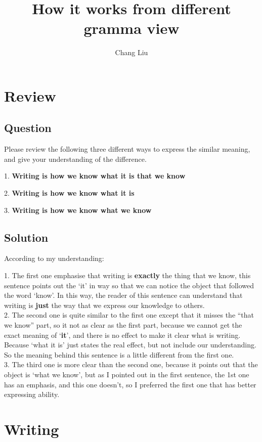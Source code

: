 \documentclass{article}
\title{How it works from different gramma view}
\author{Chang Liu}
\begin{document}
\maketitle

\section{Review}

\subsection{Question}
Please review the following three different ways to express the similar meaning, and give your understanding of the difference.

1. \textbf{Writing is how we know what it is that we know}

2. \textbf{Writing is how we know what it is}

3. \textbf{Writing is how we know what we know}

\subsection{Solution}
According to my understanding:

1. The first one emphasise that writing is \textbf{exactly} the thing that we know, this sentence points out the `it' in way so that we can notice
the object that followed the word `know'. In this way, the reader of this sentence can understand that writing is \textbf{just} the way that we express our knowledge to others.\\

2. The second one is quite similar to the first one except that it misses the ``that we know'' part, so it not as clear as the first part, because we cannot get the exact meaning of `\textbf{it}', and there is no effect to make it clear what is writing. Because `what it is' just states the real effect, but not include our understanding. So the meaning behind this sentence is a little different from the first one.\\

3. The third one is more clear than the second one, because it points out that the object is `what we know', but as I pointed out in the first sentence, the 1st one has an emphasis, and this one doesn't, so I preferred the first one that has better expressing ability.


\section{Writing}
\end{document}
